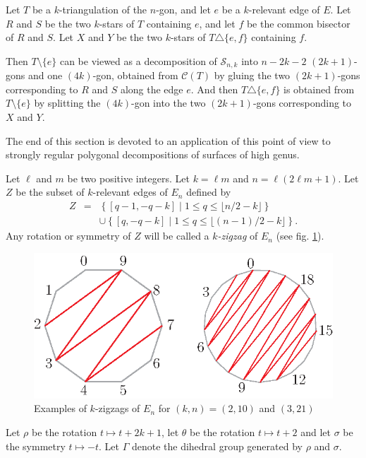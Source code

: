 \documentclass[12pt]{amsart}
\begin{document}
\begin{remark}
Let $T$ be a $k$-triangulation of the $n$-gon, and let $e$ be a $k$-relevant edge of $E$. Let $R$ and $S$ be the two $k$-stars of $T$ containing $e$, and let $f$ be the common bisector of $R$ and $S$. Let $X$ and $Y$ be the two $k$-stars of $T\triangle\{e,f\}$ containing $f$.

Then $T\setminus\{e\}$ can be viewed as a decomposition of $\mathcal{S}_{n,k}$ into $n-2k-2$ $(2k+1)$-gons and one $(4k)$-gon, obtained from $\mathcal{C}(T)$ by gluing the two $(2k+1)$-gons corresponding to $R$ and $S$ along the edge $e$. And then $T\triangle\{e,f\}$ is obtained from $T\setminus\{e\}$ by splitting the $(4k)$-gon into the two $(2k+1)$-gons corresponding to $X$ and $Y$.
\end{remark}

The end of this section is devoted to an application of this point of view to strongly regular polygonal decompositions of surfaces of high genus.

Let $\ell$ and $m$ be two positive integers. Let $k=\ell m$  and $n=\ell(2\ell m+1)$.
Let $Z$ be the subset of $k$-relevant edges of $E_n$ defined by
\begin{eqnarray*}
Z & = & \left\{[q-1,-q-k]\;|\; 1\le q\le \lfloor n/2-k\rfloor\right\}\\
&&\cup\left\{[q,-q-k]\;|\; 1\le q\le \lfloor (n-1)/2-k\rfloor\right\}.
\end{eqnarray*}
Any rotation or symmetry of $Z$ will be called a \emph{$k$-zigzag} of $E_n$ (see fig. \ref{zigzags}).


\begin{figure}[!h]
\centerline{\includegraphics[scale=1]{zigzags.eps}}
\caption{\small{Examples of $k$-zigzags of $E_n$ for $(k,n)=(2,10)$ and $(3,21)$}}\label{zigzags}
\end{figure}


Let $\rho$ be the rotation $t\mapsto t+2k+1$,  let $\theta$ be the rotation $t\mapsto t+2$ and let $\sigma$ be the symmetry $t\mapsto -t$. Let $\Gamma$ denote the dihedral group generated by $\rho$ and $\sigma$.
\end{document}
